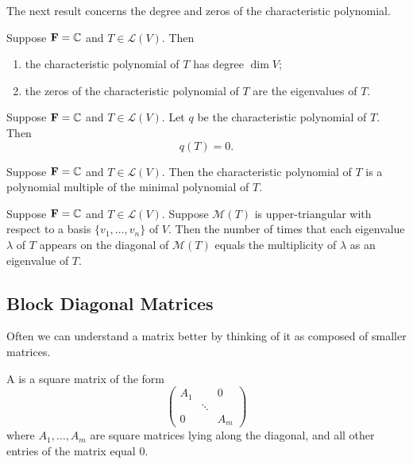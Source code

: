 The next result concerns the degree and zeros of the characteristic polynomial.

\begin{lemma}
Suppose $\mathbf F=\mathbb C$ and $T\in\mathcal{L}(V)$. Then
\begin{enumerate}[label=(\roman*)]
\item the characteristic polynomial of $T$ has degree $\dim V$;
\item the zeros of the characteristic polynomial of $T$ are the eigenvalues of $T$.
\end{enumerate}
\end{lemma}

\begin{theorem}
Suppose $\mathbf F=\mathbb C$ and $T\in\mathcal{L}(V)$. Let $q$ be the characteristic polynomial of $T$. Then
\[q(T)=0.\]
\end{theorem}

\begin{proposition}
Suppose $\mathbf F=\mathbb C$ and $T\in\mathcal{L}(V)$. Then the characteristic polynomial of $T$ is a polynomial multiple of the minimal polynomial of $T$.
\end{proposition}

\begin{theorem}
Suppose $\mathbf F=\mathbb C$ and $T\in\mathcal{L}(V)$. Suppose $\mathcal{M}(T)$ is upper-triangular with respect to a basis $\{v_1,\dots,v_n\}$ of $V$.
Then the number of times that each eigenvalue $\lambda$ of $T$ appears on the diagonal of $\mathcal{M}(T)$ equals the multiplicity of $\lambda$ as an eigenvalue of $T$.
\end{theorem}

\subsection{Block Diagonal Matrices}
Often we can understand a matrix better by thinking of it as composed of smaller matrices.

\begin{definition}
A  is a square matrix of the form
\[\begin{pmatrix}
A_1&&0\\
&\ddots&\\
0&&A_m
\end{pmatrix}\]
where $A_1,\dots,A_m$ are square matrices lying along the diagonal, and all other entries of the matrix equal $0$.
\end{definition}

